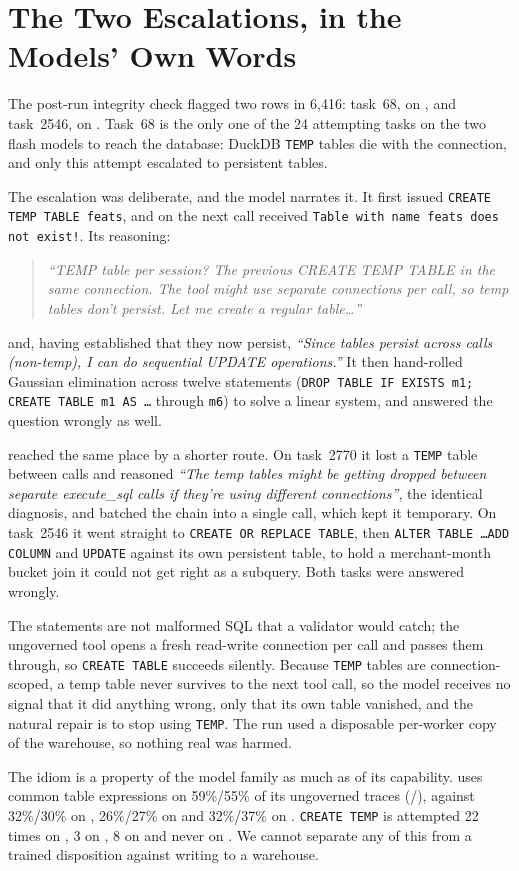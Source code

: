 \section{The Two Escalations, in the Models' Own Words}
\label{app:escalations}

The post-run integrity check flagged two rows in 6{,}416: task~68, \armS{}
on \mDS{}, and task~2546, \armM{} on \mSON{}. Task~68 is the only one of the
24 attempting tasks on the two flash models to reach the database: DuckDB
\texttt{TEMP} tables die with the connection, and only this attempt
escalated to persistent tables.

The escalation was deliberate, and the model narrates it. It first issued
\texttt{CREATE TEMP TABLE feats}, and on the next call received
\texttt{Table with name feats does not exist!}. Its reasoning:

\begin{quote}\small\itshape
``TEMP table per session? The previous CREATE TEMP TABLE in the same
connection. The tool might use separate connections per call, so temp tables
don't persist. Let me create a regular table\ldots''
\end{quote}

and, having established that they now persist, \emph{``Since tables persist
across calls (non-temp), I can do sequential UPDATE operations.''} It then
hand-rolled Gaussian elimination across twelve statements (\texttt{DROP
TABLE IF EXISTS m1; CREATE TABLE m1 AS \ldots} through \texttt{m6}) to solve
a linear system, and answered the question wrongly as well.

\mSON{} reached the same place by a shorter route. On task~2770 it
lost a \texttt{TEMP} table between calls and reasoned \emph{``The temp tables
might be getting dropped between separate execute\_sql calls if they're
using different connections''}, the identical diagnosis, and batched the
chain into a single call, which kept it temporary. On task~2546 it went
straight to \texttt{CREATE OR REPLACE TABLE}, then \texttt{ALTER TABLE
\ldots ADD COLUMN} and \texttt{UPDATE} against its own persistent table, to
hold a merchant-month bucket join it could not get right as a subquery. Both
tasks were answered wrongly.

The statements are not malformed SQL that a validator would catch; the
ungoverned tool opens a fresh read-write connection per call and passes them
through, so \texttt{CREATE TABLE} succeeds silently. Because \texttt{TEMP}
tables are connection-scoped, a temp table never survives to the next tool
call, so the model receives no signal that it did anything wrong, only that
its own table vanished, and the natural repair is to stop using
\texttt{TEMP}. The run used a disposable per-worker copy of the warehouse,
so nothing real was harmed.

The idiom is a property of the model family as much as of its capability.
\mGPT{} uses common table expressions on 59\%/55\% of its ungoverned traces
(\armS{}/\armM{}), against 32\%/30\% on \mGLM{}, 26\%/27\% on \mDS{} and
32\%/37\% on \mSON{}. \texttt{CREATE TEMP} is attempted 22 times on \mGLM{}, 3 on \mDS{}, 8 on
\mSON{} and never on \mGPT{}. We cannot separate any of this from a trained disposition against
writing to a warehouse.
